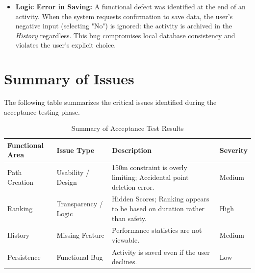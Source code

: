 \begin{itemize}
    \item \textbf{Logic Error in Saving:} A functional defect was identified at the end of an activity. When the system requests confirmation to save data, the user's negative input (selecting "No") is ignored: the activity is archived in the \textit{History} regardless. This bug compromises local database consistency and violates the user's explicit choice.
\end{itemize}

\section{Summary of Issues}
The following table summarizes the critical issues identified during the acceptance testing phase.

\begin{table}[h!]
\centering
\begin{tabular}{|l|l|p{6cm}|l|}
\hline
\textbf{Functional Area} & \textbf{Issue Type} & \textbf{Description} & \textbf{Severity} \\ \hline
Path Creation & Usability / Design & 150m constraint is overly limiting; Accidental point deletion error. & Medium \\ \hline
Ranking & Transparency / Logic & Hidden Scores; Ranking appears to be based on duration rather than safety. & High \\ \hline
History & Missing Feature & Performance statistics are not viewable. & Medium \\ \hline
Persistence & Functional Bug & Activity is saved even if the user declines. & Low \\ \hline
\end{tabular}
\caption{Summary of Acceptance Test Results}
\label{tab:test_results}
\end{table}